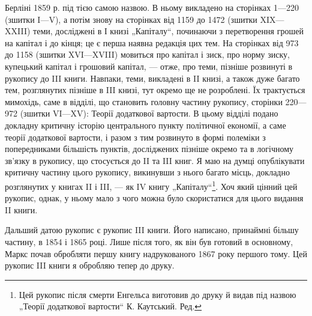 \parcont{}  %
Берліні 1859 р. під тією самою назвою. В ньому викладено на сторінках
1—220 (зшитки I—V), а потім знову на сторінках від 1159 до 1472
(зшитки XIX—XXIII) теми, досліджені в І книзі „Капіталу“, починаючи з
перетворення грошей на капітал і до кінця; це є перша наявна редакція
цих тем. На сторінках від 973 до 1158 (зшитки XVI—XVIII) мовиться
про капітал і зиск, про норму зиску, купецький капітал і грошовий капітал,
— отже, про теми, пізніше розвинуті в рукопису до III книги. Навпаки,
теми, викладені в II книзі, а також дуже багато тем, розглянутих
пізніше в III книзі, тут окремо ще не розроблені. Їх трактується мимохідь,
саме в відділі, що становить головну частину рукопису, сторінки
220—972 (зшитки VI—XV): Теорії додаткової вартости. В цьому відділі
подано докладну критичну історію центрального пункту політичної
економії, а саме теорії додаткової вартости, і разом з тим розвинуто в
формі полеміки з попередниками більшість пунктів, досліджених пізніше
окремо та в логічному зв’язку в рукопису, що стосується до II та III
книг. Я маю на думці опублікувати критичну частину цього рукопису,
викинувши з нього багато місць, докладно розглянутих у книгах II і
III, — як IV книгу „Капіталу“\footnote*{
Цей рукопис після смерти Енгельса виготовив до друку й видав під назвою
„Теорії додаткової вартости“ К. Каутський. Ред.
}. Хоч який цінний цей рукопис, однак, у
ньому мало з чого можна було скористатися для цього видання II книги.

Дальший датою рукопис є рукопис III книги. Його написано, принаймні
більшу частину, в 1854 і 1865 році. Лише після того, як він
був готовий в основному, Маркс почав обробляти першу книгу надрукованого
1867 року першого тому. Цей рукопис III книги я обробляю
тепер до друку.


